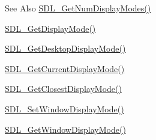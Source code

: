 \begin{DoxySeeAlso}{See Also}
\hyperlink{_s_d_l__video_8h_a5abcf18592f00019c517e791f8ba53fc}{S\-D\-L\-\_\-\-Get\-Num\-Display\-Modes()} 

\hyperlink{_s_d_l__video_8h_a0a53e003ec6ad24dd2bbbcd0ad297311}{S\-D\-L\-\_\-\-Get\-Display\-Mode()} 

\hyperlink{_s_d_l__video_8h_ab97bca68fc068a6ecc3db473c4c0defd}{S\-D\-L\-\_\-\-Get\-Desktop\-Display\-Mode()} 

\hyperlink{_s_d_l__video_8h_a14dce1cb33085b36f08d27b3d8f2335b}{S\-D\-L\-\_\-\-Get\-Current\-Display\-Mode()} 

\hyperlink{_s_d_l__video_8h_a794be92ee0a9efca226fa19a635fa470}{S\-D\-L\-\_\-\-Get\-Closest\-Display\-Mode()} 

\hyperlink{_s_d_l__video_8h_a2ca17d1e857d1560738e002c9935088a}{S\-D\-L\-\_\-\-Set\-Window\-Display\-Mode()} 

\hyperlink{_s_d_l__video_8h_a8185547bc7cb0bbeb400f459792d081a}{S\-D\-L\-\_\-\-Get\-Window\-Display\-Mode()} 
\end{DoxySeeAlso}


